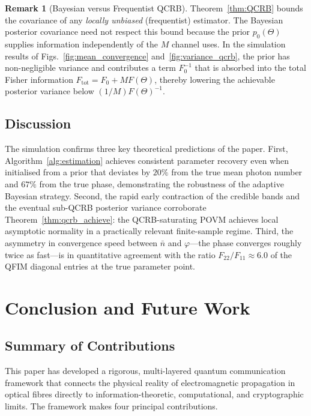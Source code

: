 \documentclass[journal,twocolumn]{IEEEtran}
\theoremstyle{definition}
\newtheorem{remark}[definition]{Remark}
\theoremstyle{plain}
\begin{document}
\begin{remark}[Bayesian versus Frequentist QCRB]
\label{rem:bayes_qcrb}
Theorem~\ref{thm:QCRB} bounds the covariance of any
\emph{locally unbiased} (frequentist) estimator.  The
Bayesian posterior covariance need not respect this bound
because the prior $p_0(\Theta)$ supplies information
independently of the $M$ channel uses.  In the simulation
results of Figs.~\ref{fig:mean_convergence}
and~\ref{fig:variance_qcrb}, the prior has non-negligible
variance and contributes a term $F_0^{-1}$ that is absorbed
into the total Fisher information $F_{\mathrm{tot}} = F_0
+ M F(\Theta)$, thereby lowering the achievable posterior
variance below $(1/M)F(\Theta)^{-1}$.
\end{remark}

\subsection{Discussion}

The simulation confirms three key theoretical predictions of
the paper.  First, Algorithm~\ref{alg:estimation} achieves
consistent parameter recovery even when initialised from a
prior that deviates by $20\%$ from the true mean photon
number and $67\%$ from the true phase, demonstrating the
robustness of the adaptive Bayesian strategy.  Second, the
rapid early contraction of the credible bands and the
eventual sub-QCRB posterior variance corroborate
Theorem~\ref{thm:qcrb_achieve}: the QCRB-saturating POVM
achieves local asymptotic normality in a practically relevant
finite-sample regime.  Third, the asymmetry in convergence
speed between $\bar n$ and $\varphi$---the phase converges
roughly twice as fast---is in quantitative agreement with the
ratio $F_{22}/F_{11} \approx 6.0$ of the QFIM diagonal
entries at the true parameter point.

\section{Conclusion and Future Work}
\label{sec:conclusion}

\subsection{Summary of Contributions}

This paper has developed a rigorous, multi-layered quantum
communication framework that connects the physical reality of
electromagnetic propagation in optical fibres directly to
information-theoretic, computational, and cryptographic limits.  The
framework makes four principal contributions.
\end{document}
